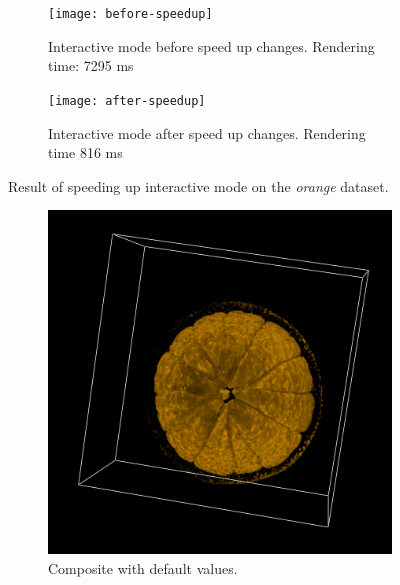 \documentclass[a4paper]{article}
\begin{document}
\begin{figure}[h]
  \centering
  \begin{subfigure}[b]{0.45\textwidth}
    \centering
    \texttt{[image: before-speedup]}
    \caption{Interactive mode before speed up changes. Rendering time: 7295 ms }
  \end{subfigure}
  \hfill
  \begin{subfigure}[b]{0.45\textwidth}
    \centering
    \texttt{[image: after-speedup]}
    \caption{Interactive mode after speed up changes. Rendering time 816 ms}
  \end{subfigure}
  \caption{Result of speeding up interactive mode on the \textit{orange} dataset.}
  \label{fig:speedup}
\end{figure}

\begin{figure}[h]
  \centering
  \begin{subfigure}[b]{0.45\textwidth}
    \centering
    \includegraphics[width=\textwidth]{orange-composite}
    \caption{Composite with default values.}
  \end{subfigure}
  \hfill
  \begin{subfigure}[b]{0.45\textwidth}
    \centering

\end{subfigure}
\end{figure}
\end{document}

